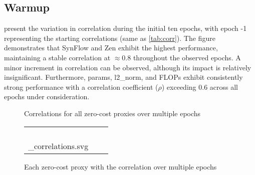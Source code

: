 \subsection{Warmup}


 present the variation in correlation during the initial ten epochs, with epoch -1 representing the starting correlations (same as \cref{tab:corr}). The figure demonstrates that \gls{SynFlow} and Zen exhibit the highest performance, maintaining a stable correlation at $\approx 0.8$ throughout the observed epochs. A minor increment in correlation can be observed, although its impact is relatively insignificant. Furthermore, params, l2\_norm, and \gls{FLOPs} exhibit consistently strong performance with a correlation coefficient ($\rho$) exceeding $0.6$ across all epochs under consideration.

\begin{figure}[!ht]
  \centering
  
  \caption{Correlations for all zero-cost proxies over multiple epochs}
  \label{fig:warmup}
\end{figure}

\clearpage

\begin{figure}[htbp]
  \centering
    \begin{adjustbox}{width=1.2\columnwidth,center}
  \begin{tabular}{ccc}
     &
     &
     \\
     &
     &
     \\
     &
     &
     \\
     &
     &
     \\
    _correlations.svg} &
     
  \end{tabular}
  \end{adjustbox}
  \caption{Each zero-cost proxy with the correlation over multiple epochs}
  \label{fig:warmup_seperate}
\end{figure}
